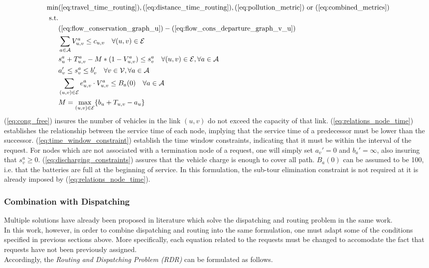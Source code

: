 \begin{align}
	\text{min}&  
		(\ref{eq:travel_time_routing}), (\ref{eq:distance_time_routing}), (\ref{eq:pollution_metric}) \text{ or } (\ref{eq:combined_metrics})
	\nonumber\\
	\text{s.t.} &\nonumber\\
	&(\ref{eq:flow_conservation_graph_u})-(\ref{eq:flow_cons_departure_graph_v_u})\nonumber\\
	&\sum_{a \in \mathcal{A}}V^a_{u,v} \leq c_{u,v} \quad \forall (u,v) \in \mathcal{E} \label{eq:cong_free}\\
	&s_{u}^a + T_{u,v}^a - M*(1-V^a_{u,v}) \leq s_{v}^a  \quad \forall (u,v) \in \mathcal{E}, \forall a \in \mathcal{A}\label{eq:relations_node_time}\\
	&a'_v \leq s_{v}^a \leq b'_v \quad \forall v \in \mathcal{V}, \forall a \in \mathcal{A}\label{eq:time_window_constraint}\\
	&\sum_{(u,v) \in \mathcal{E}}e^a_{u,v}\cdot V^a_{u,v} \leq B_a(0)\quad \forall a \in \mathcal{A} \label{eq:discharging_constraints}\\
	&M= \underset{(u,v) \in \mathcal{E}}{\text{max}}\{b_u + T_{u,v}-a_u\}\nonumber
\end{align} 
(\ref{eq:cong_free}) insures the number of vehicles in the link $(u,v)$ do not exceed the capacity of that link. (\ref{eq:relations_node_time}) establishes the relationship between the service time of each node, implying that the service time of a predecessor must be lower than the successor. (\ref{eq:time_window_constraint}) establish the time window constraints, indicating that it must be within the interval of the request. For nodes which are not associated with a termination node of a  request, one will simply set $a_v' = 0 $ and $b_a' = \infty$, also insuring that $s_v^a \ge 0 $. (\ref{eq:discharging_constraints}) assures that the vehicle charge is enough to cover all path. $B_a(0)$ can be assumed to be 100, i.e. that the batteries are full at the beginning of service. In this formulation, the sub-tour elimination constraint is not required at it is already imposed by (\ref{eq:relations_node_time}). 
\subsubsection*{Combination with Dispatching}
Multiple solutions have already been proposed in literature which solve the dispatching and routing problem in the same work. \\
In this work, however, in order to combine dispatching and routing into the same formulation, one must adapt some of the conditions specified in previous sections above. More specifically, each equation related to the requests must be changed to accomodate the fact that requests have not been previously assigned. \\
Accordingly, the \textit{Routing and Dispatching Problem (RDR)} can be formulated as follows. 

